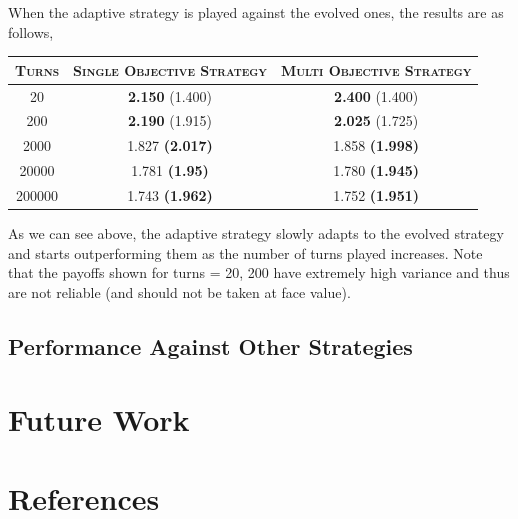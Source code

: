 \documentclass[a4paper]{article}
\begin{document}
	When the adaptive strategy is played against the evolved ones, the results are as follows,
	
	\begin{table}[H]
	  \begin{center}
	    \begin{tabular}{|c|c|c|}
	      \toprule
	 	  \textsc{Turns} & \textsc{Single Objective Strategy} & \textsc{Multi Objective Strategy}\\
	      \midrule
		  20    & \textbf{2.150} (1.400) & \textbf{2.400} (1.400)\\		  
		  200	& \textbf{2.190} (1.915) & \textbf{2.025} (1.725)\\
		  2000  & 1.827 \textbf{(2.017)} & 1.858 \textbf{(1.998)}\\
		  20000 & 1.781 \textbf{(1.95)} & 1.780 \textbf{(1.945)}\\
		  200000 & 1.743 \textbf{(1.962)} & 1.752 \textbf{(1.951)}\\
		\bottomrule
	    \end{tabular}
	  \end{center}
	\end{table}  		
	
	As we can see above, the adaptive strategy slowly adapts to the evolved strategy and starts outperforming them as the number of turns played increases. Note that the payoffs shown for turns = 20, 200 have extremely high variance and thus are not reliable (and should not be taken at face value).
	
	\subsection{Performance Against Other Strategies}
	



	\section{Future Work}
			
	\section{References}
\end{document}
